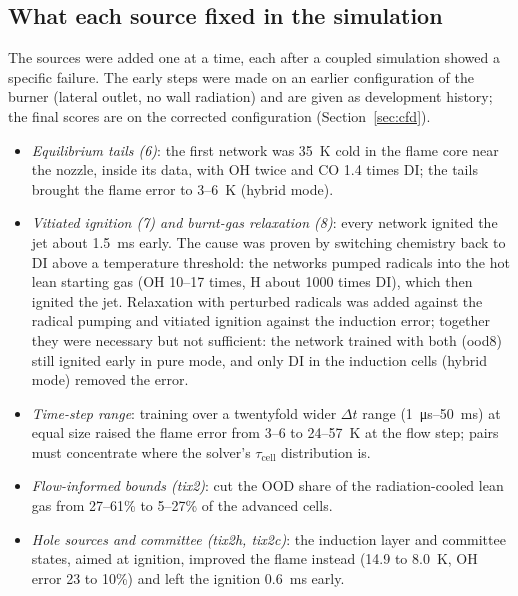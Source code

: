 \documentclass[preprint,review,12pt]{elsarticle}
\begin{document}
\subsection{What each source fixed in the simulation}
The sources were added one at a time, each after a coupled simulation showed a specific failure. The early steps were
made on an earlier configuration of the burner (lateral outlet, no wall radiation) and are given as development
history; the final scores are on the corrected configuration (Section~\ref{sec:cfd}).
\begin{itemize}
\item \emph{Equilibrium tails (6)}: the first network was 35~K cold in the flame core near the nozzle, inside its data,
  with OH twice and CO 1.4 times DI; the tails brought the flame error to 3--6~K (hybrid mode).
\item \emph{Vitiated ignition (7) and burnt-gas relaxation (8)}: every network ignited the jet about 1.5~ms early. The
  cause was proven by switching chemistry back to DI above a temperature threshold: the networks pumped radicals into
  the hot lean starting gas (OH 10--17 times, H about 1000 times DI), which then ignited the jet. Relaxation with
  perturbed radicals was added against the radical pumping and vitiated ignition against the induction error;
  together they were necessary but not sufficient: the network trained with both (ood8) still ignited early in
  pure mode, and only DI in the induction cells (hybrid mode) removed the error.
\item \emph{Time-step range}: training over a twentyfold wider $\Delta t$ range (\SI{1}{\micro s}--50~ms) at equal size
  raised the flame error from 3--6 to 24--57~K at the flow step; pairs must concentrate where the solver's
  $\tau_\mathrm{cell}$ distribution is.
\item \emph{Flow-informed bounds (tix2)}: cut the OOD share of the radiation-cooled lean gas from 27--61\% to 5--27\% of the
  advanced cells.
\item \emph{Hole sources and committee (tix2h, tix2c)}: the induction layer and committee states, aimed at ignition,
  improved the flame instead (14.9 to 8.0~K, OH error 23 to 10\%) and left the ignition 0.6~ms early.
\end{itemize}
\end{document}
